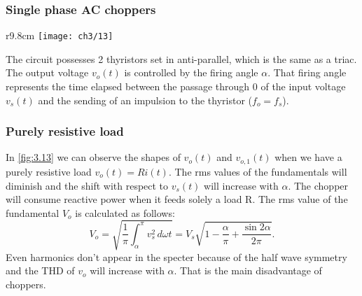 			\subsubsection{Single phase AC choppers}
		 	\begin{wrapfigure}[7]{r}{9.8cm}
			\vspace{-5mm}
			\texttt{[image: ch3/13]}
			\label{fig:3.13}
			\end{wrapfigure}
			The circuit possesses 2 thyristors set in anti-parallel, which is the same as a triac. The output voltage $v_o(t)$ is controlled by the firing angle $\alpha$. That firing angle represents the time elapsed between the passage through 0 of the input voltage $v_s(t)$ and the sending of an impulsion to the thyristor ($f_o = f_s$). 
			
			\subsubsection{Purely resistive load}
				In \autoref{fig:3.13} we can observe the shapes of $v_o(t)$ and $v_{o,1}(t)$ when we have a purely resistive load $v_o(t) = Ri(t)$. The rms values of the fundamentals will diminish and the shift with respect to $v_s(t)$ will increase with $\alpha$. The chopper will consume reactive power when it feeds solely a load R. The rms value of the fundamental $V_o$ is calculated as follows:
				\begin{equation}
					V_o = \sqrt{\frac{1}{\pi}\int _\alpha ^\pi v_s^2 \, d\omega t} = V_s \sqrt{1- \frac{\alpha}{\pi} + \frac{\sin 2\alpha}{2\pi}}. 
				\end{equation}
				Even harmonics don't appear in the specter because of the half wave symmetry and the THD of $v_o$ will increase with $\alpha$. That is the main disadvantage of choppers. 
	
